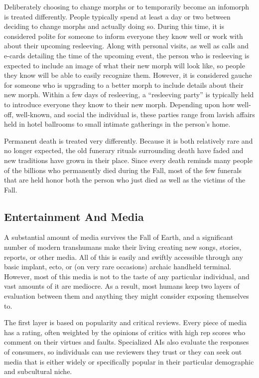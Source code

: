Deliberately choosing to change morphs or to temporarily become an infomorph is treated differently. 
People typically spend at least a day or two between 
deciding to change morphs and actually doing so. 
During this time, it is considered polite for someone 
to inform everyone they know well or work with 
about their upcoming resleeving. Along with personal 
visits, as well as calls and e-cards detailing the time 
of the upcoming event, the person who is resleeving 
is expected to include an image of what their new 
morph will look like, so people they know will be 
able to easily recognize them. However, it is considered gauche for someone who is upgrading to a better 
morph to include details about their new morph. 
Within a few days of resleeving, a ``resleeving party'' 
is typically held to introduce everyone they know 
to their new morph. Depending upon how well-off, 
well-known, and social the individual is, these parties 
range from lavish affairs held in hotel ballrooms to 
small intimate gatherings in the person's home.

Permanent death is treated very differently. Because 
it is both relatively rare and no longer expected, the 
old funerary rituals surrounding death have faded 
and new traditions have grown in their place. Since 
every death reminds many people of the billions who 
permanently died during the Fall, most of the few 
funerals that are held honor both the person who just 
died as well as the victims of the Fall.

\subsection{Entertainment And Media}

A substantial amount of media survives the Fall of 
Earth, and a significant number of modern transhumans make their living creating new songs, stories, 
reports, or other media. All of this is easily and swiftly 
accessible through any basic implant, ecto, or (on very 
rare occasions) archaic handheld terminal. However, 
most of this media is not to the taste of any particular 
individual, and vast amounts of it are mediocre. As 
a result, most humans keep two layers of evaluation 
between them and anything they might consider exposing themselves to.

The first layer is based on popularity and critical reviews. Every piece of media has a rating, often weighted by the opinions of critics with high rep scores who 
comment on their virtues and faults. Specialized AIs 
also evaluate the responses of consumers, so individuals can use reviewers they trust or they can seek out 
media that is either widely or specifically popular in 
their particular demographic and subcultural niche.

